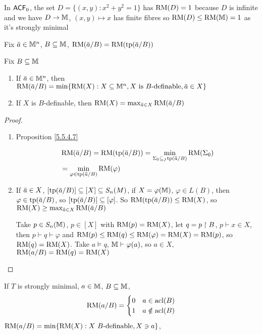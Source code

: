 \documentclass[11pt]{article}
\begin{document}
\begin{examplle}[]
In \(\textsf{ACF}_0\), the set \(D=\{(x,y):x^2+y^2=1\}\) has \(\operatorname{RM}(D)=1\) because \(D\) is infinite and we
have \(D\to\mathbb{M}\), \((x,y)\mapsto x\) has finite fibres so \(\operatorname{RM}(D)\le\operatorname{RM}(\mathbb{M})=1\) as it's strongly minimal
\end{examplle}

\begin{definition}[]
Fix \(\bara\in\M^n\), \(B\subseteq\mathbb{M}\), \(\RM(\bara/B)=\RM(\tp(\bara/B))\)
\end{definition}

\begin{proposition}[]
Fix \(B\subseteq\mathbb{M}\)
\begin{enumerate}
\item If \(\bara\in\M^n\), then \(\RM(\bara/B)=\min\{\RM(X):X\subseteq\M^n,X\text{ is $B$-definable},\bara\in X\}\)
\item If \(X\) is \(B\)-definable, then \(\RM(X)=\max_{\bara\in X}\RM(\bara/B)\)
\end{enumerate}
\end{proposition}

\begin{proof}
\begin{enumerate}
\item Proposition \ref{5.5.4.7}

\begin{align*}
&\RM(\bara/B)=\RM(\tp(\bara/B))=\min_{\Sigma_0\subseteq_f\tp(\bara/B)}\RM(\Sigma_0)\\
&=\min_{\varphi\in\tp(\bara/B)}\RM(\varphi)
\end{align*}
\item If \(\bara\in X\), \([\tp(\bara/B)]\subseteq[X]\subseteq S_n(M)\), if \(X=\varphi(\mathbb{M})\), \(\varphi\in L(B)\), then
\(\varphi\in\tp(\bara/B)\), so \([\tp(\bara/B)]\subseteq[\varphi]\). So \(\RM(\tp(\bara/B))\le\RM(X)\),
so \(\RM(X)\ge\max_{\bara\in X}\RM(\bara/B)\)

Take \(p\in S_n(\mathbb{M})\), \(p\in[X]\) with \(\operatorname{RM}(p)=\operatorname{RM}(X)\), let \(q=p\upharpoonright B\), \(p\vdash x\in X\), then
\(p\vdash q\vdash\varphi\) and \(\operatorname{RM}(p)\le\operatorname{RM}(q)\le\operatorname{RM}(\varphi)=\operatorname{RM}(X)=\operatorname{RM}(p)\), so \(\operatorname{RM}(q)=\operatorname{RM}(X)\). Take
\(a\vDash q\), \(\mathbb{M}\vdash\varphi(a)\), so \(a\in X\), \(\operatorname{RM}(a/B)=\operatorname{RM}(q)=\operatorname{RM}(X)\)
\end{enumerate}
\end{proof}

\begin{examplle}[]
If \(T\) is strongly minimal, \(a\in\mathbb{M}\), \(B\subseteq\mathbb{M}\),
\begin{equation*}
\operatorname{RM}(a/B)=
\begin{cases}
0&a\in\operatorname{acl}(B)\\
1&a\notin\operatorname{acl}(B)
\end{cases}
\end{equation*}
\(\operatorname{RM}(a/B)=\min\{\operatorname{RM}(X):X\text{ $B$-definable},X\ni a\}\),
\end{examplle}
\end{document}
